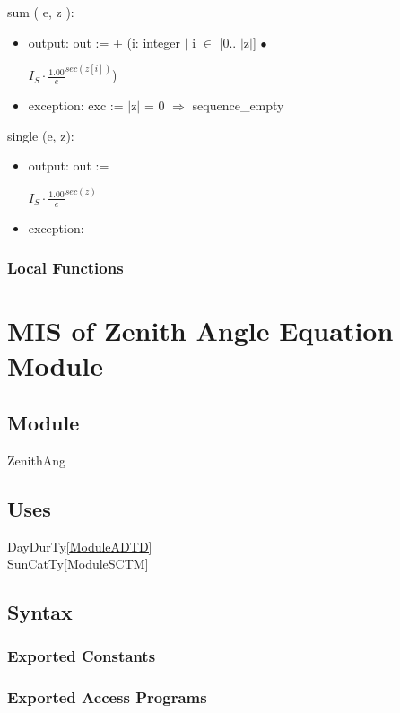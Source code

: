 \documentclass[12pt, titlepage]{article}
\begin{document}
\noindent sum ( e, z ):
\begin{itemize}
\item output: out := + (i: integer $|$ i $\in$ [0.. $|$z$|$] $\bullet$ 
\begin{center}\large
$I_{S} \cdot \frac{1.00}{e}^{sec(z [ i ])} $)
\end{center}
\item exception: exc := $|$z$|$ = 0 $\Rightarrow$ sequence\_empty
\end{itemize}

\noindent single (e, z):
\begin{itemize}
\item output: out := 
\begin{center}\large
$I_{S} \cdot \frac{1.00}{e}^{sec(z)} $
\end{center}
\item exception: 
\end{itemize}

\subsubsection{Local Functions}


\section{MIS of Zenith Angle Equation Module} \label{ModuleZA} 

\subsection{Module}
ZenithAng


\subsection{Uses}
DayDurTy\ref{ModuleADTD}\\
SunCatTy\ref{ModuleSCTM}

\subsection{Syntax}

\subsubsection{Exported Constants}


\subsubsection{Exported Access Programs}
\end{document}
